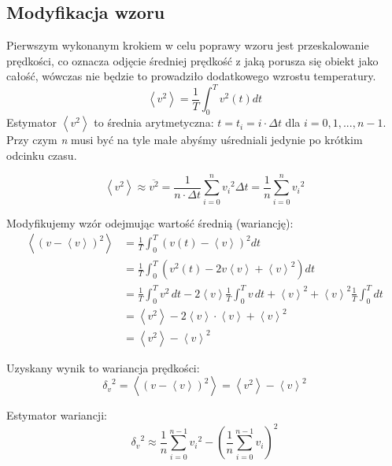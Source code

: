\documentclass[12pt, letterpaper]{report}
\begin{document}
    \subsection{Modyfikacja wzoru}
    Pierwszym wykonanym krokiem w celu poprawy wzoru jest przeskalowanie prędkości, co oznacza odjęcie 
    średniej prędkość z jaką porusza się obiekt jako całość, wówczas nie będzie
    to prowadziło dodatkowego wzrostu temperatury. 
    \begin{equation}
        \left< v^{2} \right> = \frac{1}{T} \int_{0}^{T} v^2(t) dt
    \end{equation}
    Estymator $\left< v^{2} \right>$ to średnia arytmetyczna: 
    $t = t_i = i \cdot \Delta t$ dla $i = 0, 1, ..., n-1$. Przy czym \emph{n} musi być na tyle małe
    abyśmy uśredniali jedynie po krótkim odcinku czasu.

    \begin{equation}
        \left< v^{2} \right>  \approx  \overline{v^2} = \frac{1}{n \cdot \Delta t} \sum_{i = 0}^{n} {v_i}^2 \Delta t
        = \frac{1}{n} \sum_{i = 0}^n {v_i}^2
    \end{equation}

    Modyfikujemy wzór odejmując wartość średnią (wariancję):
    \begin{align*}
        \left< \left( v - \left< v \right> \right)^2 \right>  &=  
        \frac{1}{T} \int_{0}^{T} \left( v(t) - \left< v \right> \right)^2 dt  \\
        &= \frac{1}{T} \int_{0}^{T} \left( v^2(t) - 2v \left< v \right> + \left< v \right>^2 \right) dt  \\
        &= \frac{1}{T} \int_{0}^{T} v^2 \, dt - 2 \left< v \right> \frac{1}{T} \int_{0}^{T} v \, dt + \left< v \right>^2 
        + \left< v \right>^2 \frac{1}{T} \int_{0}^{T} dt \\
        &= \left< v^2 \right> - 2 \left< v \right> \cdot \left< v \right> + \left< v \right>^2 \\
        &= \left< v^2 \right> - \left< v \right>^2
    \end{align*}

    Uzyskany wynik to wariancja prędkości:
    \begin{equation}
        {\delta_v}^2  =  \left< \left( v - \left< v \right> \right)^2 \right>  =  \left< v^2 \right> - \left< v \right>^2
    \end{equation}

    Estymator wariancji:
    \begin{equation}
        {\delta_v}^2  \approx  \frac{1}{n} \sum_{i = 0}^{n - 1} {v_i}^2 - \left( \frac{1}{n} \sum_{i = 0}^{n - 1} {v_i} \right)^2
    \end{equation}
\end{document}
